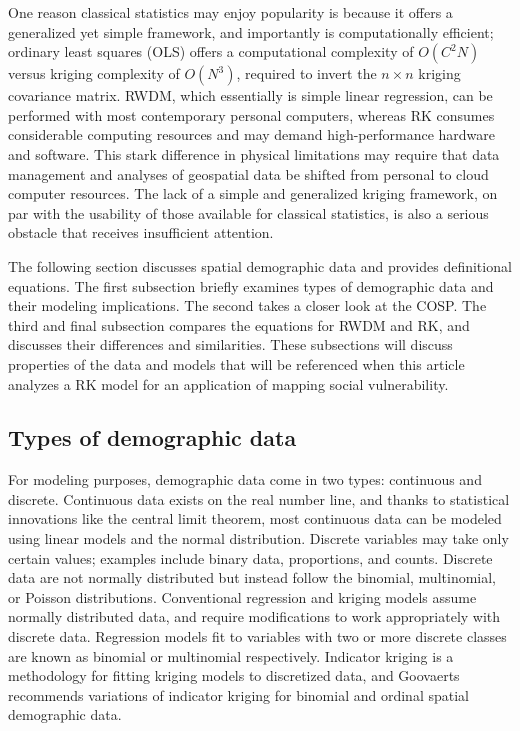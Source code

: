 One reason classical statistics may enjoy popularity is because it offers a generalized yet simple framework, and importantly is computationally efficient; ordinary least squares (OLS) offers a computational complexity of $O(C^2N)$ versus kriging complexity of $O(N^3)$, required to invert the $n \times n$ kriging covariance matrix.  RWDM, which essentially is simple linear regression, can be performed with most contemporary personal computers, whereas RK consumes considerable computing resources and may demand high-performance hardware and software.  This stark difference in physical limitations may require that data management and analyses of geospatial data be shifted from personal to cloud computer resources.  The lack of a simple and generalized kriging framework, on par with the usability of those available for classical statistics, is also a serious obstacle that receives insufficient attention.

The following section discusses spatial demographic data and provides definitional equations.  The first subsection briefly examines types of demographic data and their modeling implications.  The second takes a closer look at the COSP.  The third and final subsection compares the equations for RWDM and RK, and discusses their differences and similarities.  These subsections will discuss properties of the data and models that will be referenced when this article analyzes a RK model for an application of mapping social vulnerability.


\subsection{Types of demographic data}

For modeling purposes, demographic data come in two types: continuous and discrete.  Continuous data exists on the real number line, and thanks to statistical innovations like the central limit theorem, most continuous data can be modeled using linear models and the normal distribution.  Discrete variables may take only certain values; examples include binary data, proportions, and counts.  Discrete data are not normally distributed but instead follow the binomial, multinomial, or Poisson distributions.  Conventional regression and kriging models assume normally distributed data, and require modifications to work appropriately with discrete data.  Regression models fit to variables with two or more discrete classes are known as binomial or multinomial respectively.  Indicator kriging is a methodology for fitting kriging models to discretized data, and Goovaerts \cite{goovaerts10} recommends variations of indicator kriging for binomial and ordinal spatial demographic data.

